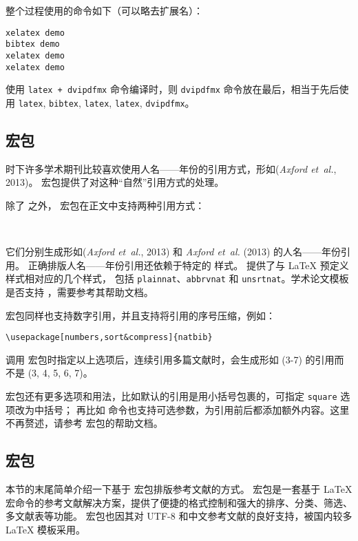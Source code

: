 整个过程使用的命令如下（可以略去扩展名）：
\begin{verbatim}
xelatex demo
bibtex demo
xelatex demo
xelatex demo
\end{verbatim}

使用 \texttt{latex + dvipdfmx} 命令编译时，则 \texttt{dvipdfmx} 命令放在最后，相当于先后使用
\texttt{latex}, \texttt{bibtex}, \texttt{latex}, \texttt{latex}, \texttt{dvipdfmx}。

\subsection{ 宏包}\label{subsec:natbib}

时下许多学术期刊比较喜欢使用人名——年份的引用方式，形如(\emph{Axford et~al.}, 2013)。
 宏包提供了对这种“自然”引用方式的处理。

除了  之外， 宏包在正文中支持两种引用方式：
\begin{command}
 \\
\end{command}

它们分别生成形如(\emph{Axford et~al.}, 2013) 和 \emph{Axford et~al.} (2013) 的人名——年份引用。
正确排版人名——年份引用还依赖于特定的  样式。 提供了与 \LaTeX{} 预定义样式相对应的几个样式，
包括 \texttt{plainnat}、\texttt{abbrvnat} 和 \texttt{unsrtnat}。学术论文模板是否支持 ，需要参考其帮助文档。

 宏包同样也支持数字引用，并且支持将引用的序号压缩，例如：
\begin{verbatim}
\usepackage[numbers,sort&compress]{natbib}
\end{verbatim}
调用  宏包时指定以上选项后，连续引用多篇文献时，会生成形如 (3-7) 的引用而不是 (3, 4, 5, 6, 7)。

 宏包还有更多选项和用法，比如默认的引用是用小括号包裹的，可指定 \texttt{square} 选项改为中括号；
再比如  命令也支持可选参数，为引用前后都添加额外内容。这里不再赘述，请参考  宏包的帮助文档。


\subsection{ 宏包}\label{subsec:biblatex}

本节的末尾简单介绍一下基于  宏包排版参考文献的方式。
 宏包是一套基于 \LaTeX{} 宏命令的参考文献解决方案，提供了便捷的格式控制和强大的排序、分类、筛选、多文献表等功能。
 宏包也因其对 UTF-8 和中文参考文献的良好支持，被国内较多 \LaTeX{} 模板采用。

